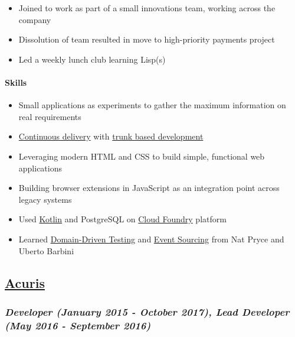 \begin{itemize}
\tightlist
\item
  Joined to work as part of a small innovations team, working across the
  company
\item
  Dissolution of team resulted in move to high-priority payments project
\item
  Led a weekly lunch club learning Lisp(s)
\end{itemize}

\paragraph{Skills}\label{skills}

\begin{itemize}
\tightlist
\item
  Small applications as experiments to gather the maximum information on
  real requirements
\item
  \href{https://continuousdelivery.com/}{Continuous delivery} with
  \href{https://trunkbaseddevelopment.com/}{trunk based development}
\item
  Leveraging modern HTML and CSS to build simple, functional web
  applications
\item
  Building browser extensions in JavaScript as an integration point
  across legacy systems
\item
  Used \href{https://kotlinlang.org/}{Kotlin} and PostgreSQL on
  \href{https://www.cloudfoundry.org/}{Cloud Foundry} platform
\item
  Learned
  \href{http://www.natpryce.com/articles/000819.html}{Domain-Driven
  Testing} and
  \href{https://martinfowler.com/eaaDev/EventSourcing.html}{Event
  Sourcing} from Nat Pryce and Uberto Barbini
\end{itemize}

\subsection{\texorpdfstring{\href{http://www.acuris.com/}{Acuris}}{Acuris}}\label{acuris-1}

\subsubsection{\texorpdfstring{\emph{Developer (January 2015 - October
2017), Lead Developer (May 2016 - September
2016)}}{Developer (January 2015 - October 2017), Lead Developer (May 2016 - September 2016)}}\label{developer-january-2015---october-2017-lead-developer-may-2016---september-2016}

